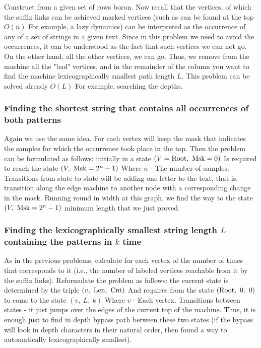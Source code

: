 Construct from a given set of rows boron. Now recall that the vertices, of which the suffix links can be achieved marked vertices (such as can be found at the top $O (n)$ For example, a lazy dynamics) can be interpreted as the occurrence of any of a set of strings in a given text. Since in this problem we need to avoid the occurrences, it can be understood as the fact that such vertices we can not go. On the other hand, all the other vertices, we can go. Thus, we remove from the machine all the "bad" vertices, and in the remainder of the column you want to find the machine lexicographically smallest path length $L$. This problem can be solved already $O (L)$ For example, searching the depths.

\subsubsection{ Finding the shortest string that contains all occurrences of both patterns }

Again we use the same idea. For each vertex will keep the mask that indicates the samples for which the occurrence took place in the top. Then the problem can be formulated as follows: initially in a state $(V = {\rm Root}, ~ {\rm Msk} = 0)$ Is required to reach the state $(V, ~ {\rm Msk} = 2 ^ n-1)$ Where $n$ - The number of samples. Transitions from state to state will be adding one letter to the text, that is, transition along the edge machine to another node with a corresponding change in the mask. Running round in width at this graph, we find the way to the state $(V, ~ {\rm Msk} = 2 ^ n-1)$ minimum length that we just proved.

\subsubsection{ Finding the lexicographically smallest string length $L$ containing the patterns in $k$ time }

As in the previous problems, calculate for each vertex of the number of times that corresponds to it (i.e., the number of labeled vertices reachable from it by the suffix links). Reformulate the problem as follows: the current state is determined by the triple $(v, ~ {\rm Len, ~ Cnt})$ And requires from the state $({\rm Root}, ~ 0, ~ 0)$ to come to the state $(v, ~ L, ~ k)$ Where $v$ - Each vertex. Transitions between states - it just jumps over the edges of the current top of the machine. Thus, it is enough just to find in depth bypass path between these two states (if the bypass will look in depth characters in their natural order, then found a way to automatically lexicographically smallest).

